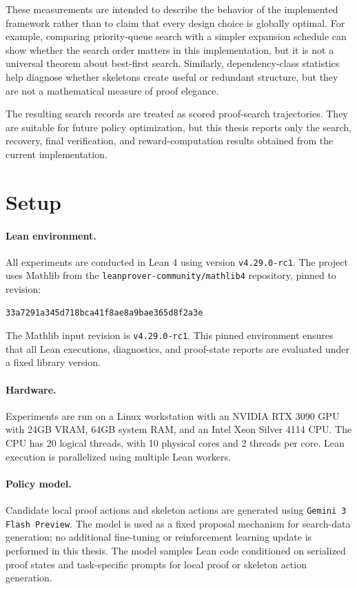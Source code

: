 \documentclass[en]{uet_awesome_thesis/uet-awesome-thesis}
\begin{document}
These measurements are intended to describe the behavior of the implemented framework rather than to claim that every design choice is globally optimal. For example, comparing priority-queue search with a simpler expansion schedule can show whether the search order matters in this implementation, but it is not a universal theorem about best-first search. Similarly, dependency-class statistics help diagnose whether skeletons create useful or redundant structure, but they are not a mathematical measure of proof elegance.

The resulting search records are treated as scored proof-search trajectories. They are suitable for future policy optimization, but this thesis reports only the search, recovery, final verification, and reward-computation results obtained from the current implementation.

\section{Setup}

\paragraph{Lean environment.}
All experiments are conducted in Lean 4 using version \texttt{v4.29.0-rc1}. The project uses Mathlib \citep{mathlib2020}
from the \texttt{leanprover-community/mathlib4} repository, pinned to revision:
\begin{verbatim}
33a7291a345d718bca41f8ae8a9bae365d8f2a3e
\end{verbatim}
The Mathlib input revision is \texttt{v4.29.0-rc1}. This pinned environment ensures that all Lean
executions, diagnostics, and proof-state reports are evaluated under a fixed library version.

\paragraph{Hardware.}
Experiments are run on a Linux workstation with an NVIDIA RTX 3090 GPU with 24GB VRAM, 64GB
system RAM, and an Intel Xeon Silver 4114 CPU. The CPU has 20 logical threads, with 10 physical cores
and 2 threads per core. Lean execution is parallelized using multiple Lean workers.

\paragraph{Policy model.}
Candidate local proof actions and skeleton actions are generated using \texttt{Gemini 3 Flash Preview}. The model is used
as a fixed proposal mechanism for search-data generation; no additional fine-tuning or reinforcement
learning update is performed in this thesis. The model samples Lean code conditioned on serialized proof
states and task-specific prompts for local proof or skeleton action generation.
\end{document}
